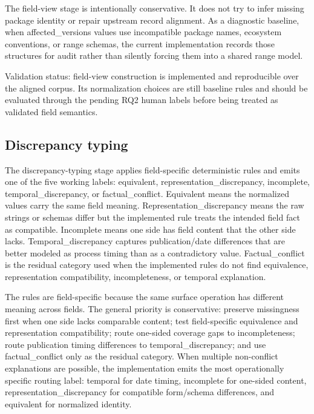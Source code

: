 The field-view stage is intentionally conservative. It does not try to infer missing package identity or repair upstream record alignment. As a diagnostic baseline, when affected\_versions values use incompatible package names, ecosystem conventions, or range schemas, the current implementation records those structures for audit rather than silently forcing them into a shared range model.

Validation status: field-view construction is implemented and reproducible over the aligned corpus. Its normalization choices are still baseline rules and should be evaluated through the pending RQ2 human labels before being treated as validated field semantics.

\subsection{Discrepancy typing}

The discrepancy-typing stage applies field-specific deterministic rules and emits one of the five working labels: equivalent, representation\_discrepancy, incomplete, temporal\_discrepancy, or factual\_conflict. Equivalent means the normalized values carry the same field meaning. Representation\_discrepancy means the raw strings or schemas differ but the implemented rule treats the intended field fact as compatible. Incomplete means one side has field content that the other side lacks. Temporal\_discrepancy captures publication/date differences that are better modeled as process timing than as a contradictory value. Factual\_conflict is the residual category used when the implemented rules do not find equivalence, representation compatibility, incompleteness, or temporal explanation.

The rules are field-specific because the same surface operation has different meaning across fields. The general priority is conservative: preserve missingness first when one side lacks comparable content; test field-specific equivalence and representation compatibility; route one-sided coverage gaps to incompleteness; route publication timing differences to temporal\_discrepancy; and use factual\_conflict only as the residual category. When multiple non-conflict explanations are possible, the implementation emits the most operationally specific routing label: temporal for date timing, incomplete for one-sided content, representation\_discrepancy for compatible form/schema differences, and equivalent for normalized identity.

